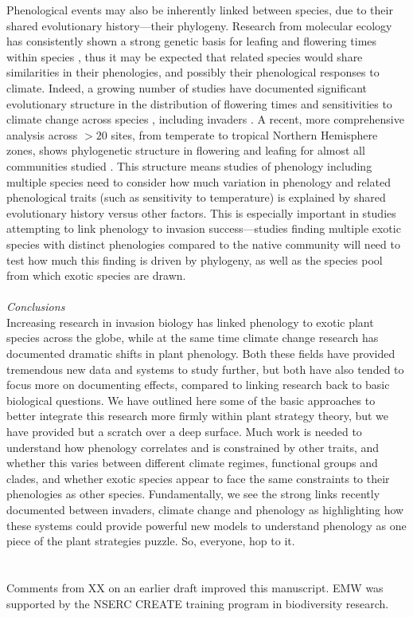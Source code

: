 \documentclass[11pt,a4paper,oneside]{article}
\begin{document}
Phenological events may also be inherently linked between species, due to their shared evolutionary history---their phylogeny. Research from molecular ecology has consistently shown a strong genetic basis for leafing and flowering times within species \citep{Howe:2003,arabid2011}, thus it may be expected that related species would share similarities in their phenologies, and possibly their phenological responses to climate. Indeed, a growing number of studies have documented significant evolutionary structure in the distribution of flowering times and sensitivities to climate change across species \citep{Willis:2008bf,Davis:2010ls}, including invaders \citep{Willis:2010al,wolkovichAmBot2013}. A recent, more comprehensive analysis across \(>20\) sites, from temperate to tropical Northern Hemisphere zones, shows phylogenetic structure in flowering and leafing for almost all communities studied \citep{phenophylo}. This structure means studies of phenology including multiple species need to consider how much variation in phenology and related phenological traits (such as sensitivity to temperature) is explained by shared evolutionary history versus other factors. This is especially important in studies attempting to link phenology to invasion success---studies finding multiple exotic species with distinct phenologies compared to the native community will need to test how much this finding is driven by phylogeny, as well as the species pool from which exotic species are drawn. \\
\\
\noindent \emph{Conclusions}\\
Increasing research in invasion biology has linked phenology to exotic plant species across the globe, while at the same time climate change research has documented dramatic shifts in plant phenology. Both these fields have provided tremendous new data and systems to study further, but both have also tended to focus more on documenting effects, compared to linking research back to basic biological questions. We have outlined here some of the basic approaches to better integrate this research more firmly within plant strategy theory, but we have provided but a scratch over a deep surface. Much work is needed to understand how phenology correlates and is constrained by other traits, and whether this varies between different climate regimes, functional groups and clades, and whether exotic species appear to face the same constraints to their phenologies as other species. Fundamentally, we see the strong links recently documented between invaders, climate change and phenology as highlighting how these systems could provide powerful new models to understand phenology as one piece of the plant strategies puzzle. So, everyone, hop to it.\\
\\
\\
Comments from XX on an earlier draft improved this manuscript. EMW was supported by the NSERC CREATE training program in biodiversity research.  
\end{document}
